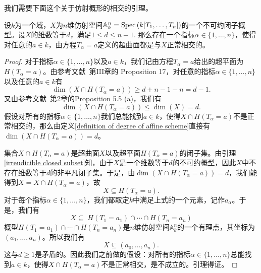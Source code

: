 我们需要下面这个关于仿射概形的相交的引理。
\begin{lemma} \label{intersection with a hyperplane}
设$k$为一个域，$X$为$n$维仿射空间$\mathbb{A}^n_{k} = \operatorname{Spec} \left(k[T_1,\ldots,T_n]\right)$的一个不可约闭子概型。设$X$的维数等于$d$，满足$1 \leqslant d \leqslant n-1.$ 那么存在一个指标$\alpha \in \{1,\ldots,n\}$，使得对任意的$a \in k$，由方程$T_{\alpha} = a$定义的超曲面都是与$X$正常相交的。
\end{lemma}
\begin{proof}
对于指标$\alpha \in \{1,\ldots,n\}$以及$a \in k$，我们记由方程$T_{\alpha} = a$给出的超平面为$H(T_{\alpha} = a)$。由参考文献~第III章的 Proposition 17，对任意的指标$\alpha \in \{1,\ldots,n\}$以及任意的$a \in k$有
\begin{equation}
\dim(X\cap H(T_{\alpha}=a)) \geqslant d+n-1-n = d-1.
\end{equation}
又由参考文献~第2章的Proposition 5.5 (a)，我们有
\begin{equation}
\dim(X\cap H(T_{\alpha}=a)) \leqslant \dim(X) = d.
\end{equation}
假设对所有的指标$\alpha \in \{1,\ldots,n\}$我们总能找到$a \in k$，使得$X \cap H(T_\alpha=a)$不是正常相交的，那么由定义\ref{definition of degree of affine scheme}直接有$\dim(X\cap H(T_{\alpha} = a)) = d$。

集合$X\cap H(T_{\alpha} = a)$是超曲面$X$以及超平面$H(T_{\alpha} = a)$的闭子集。由引理\ref{irreudicible closed subset}知，由于$X$是一个维数等于$d$的不可约概型，因此$X$中不存在维数等于$d$的非平凡闭子集。于是，由$\dim(X\cap H(T_{\alpha} = a)) = d$，我们能得到$X = X\cap H(T_{\alpha} = a)$，故
\begin{equation}
X \subseteq H(T_{\alpha} = a).
\end{equation}
对于每个指标$\alpha \in \{1,\ldots,n\}$，我们都取定$k$中满足上式的一个元素，记作$a_{\alpha}$。于是，我们有
\begin{equation}
X \subseteq \; H(T_1=a_1) \cap \cdots \cap H(T_n=a_n)
\end{equation}
概型$H(T_1=a_1) \cap \cdots \cap H(T_n=a_n)$是$n$维仿射空间$\mathbb{A}^n_{k}$的一个有理点，其坐标为$(a_1,\ldots,a_n)$。所以我们有
$$X\subseteq (a_0,\ldots,a_n).$$
这与$d \geqslant 1$是矛盾的。因此我们之前做的假设：对所有的指标$\alpha \in \{1,\ldots,n\}$总能找到$a \in k$，使得$X \cap H(T_\alpha=a)$不是正常相交，是不成立的。引理得证。
\end{proof}

